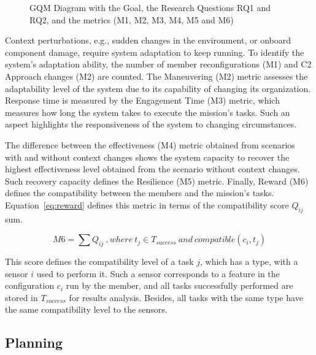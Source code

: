 \begin{figure}[ht]
    \centering
    \scalebox{.52}{}
    \caption{GQM Diagram with the Goal, the Research Questions RQ1 and RQ2, and the metrics (M1, M2, M3, M4, M5 and M6)}
    \label{fig:gqm}
\end{figure}





Context perturbations, e.g., sudden changes in the environment, or onboard component damage, require system adaptation to keep running. To identify the system's adaptation ability, the number of \color{black}member reconfigurations (M1) \color{black}and C2 Approach changes (M2) are counted. The Maneuvering (M2) metric assesses the adaptability level of the system due to its capability of \color{black} changing its organization. Response time \color{black} is measured by the Engagement Time (M3) metric, which measures how long the system takes to execute the mission's tasks. Such an aspect highlights the responsiveness of the system to changing circumstances.  

The difference between the effectiveness (M4) metric obtained from scenarios with and without context changes shows the system capacity to recover the highest effectiveness level obtained from the scenario without context changes. Such recovery capacity defines the Resilience (M5) metric. Finally, Reward (M6) defines  the compatibility between the members and the \color{black}mission's tasks. \color{black}Equation~\ref{eq:reward} defines this metric in terms of the compatibility score $Q_{ij}$ sum.

\begin{equation}
    \label{eq:reward}
    M6=\sum Q_{ij} \ ,where\  t_j \in T_{success} \ and\ compatible(c_i,t_j)
\end{equation}

This score defines the compatibility level of a task $j$, which has a type, with a sensor $i$ used to perform it. Such a sensor corresponds to a feature in the configuration $c_i$ run by the member, and all tasks successfully performed are stored in $T_{success}$ for results analysis. Besides, all tasks with the same type have the same compatibility level to the sensors.


\subsection{Planning}
\label{ssec:planning}

